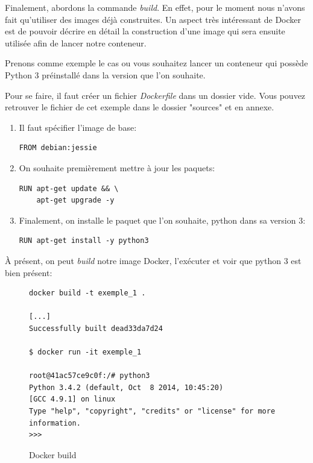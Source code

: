 Finalement, abordons la commande \emph{build}. En effet, pour le moment nous n'avons fait qu'utiliser des images déjà construites. Un aspect très intéressant de Docker est de pouvoir décrire en détail la construction d'une image qui sera ensuite utilisée afin de lancer notre conteneur.

Prenons comme exemple le cas ou vous souhaitez lancer un conteneur qui possède Python 3 préinstallé dans la version que l'on souhaite.

Pour se faire, il faut créer un fichier \emph{Dockerfile} dans un dossier vide. Vous pouvez retrouver le fichier de cet exemple dans le dossier "sources" et en annexe.

\begin{enumerate}
\item Il faut spécifier l'image de base:
\begin{lstlisting}[frame=single]
FROM debian:jessie
\end{lstlisting}

\item On souhaite premièrement mettre à jour les paquets:
\begin{lstlisting}[frame=single]
RUN apt-get update && \
    apt-get upgrade -y
\end{lstlisting}

\item Finalement, on installe le paquet que l'on souhaite, python dans sa version 3:
\begin{lstlisting}[frame=single]
RUN apt-get install -y python3
\end{lstlisting}

\end{enumerate}

\newpage
À présent, on peut \emph{build} notre image Docker, l'exécuter et voir que python 3 est bien présent:

\begin{figure}[H] 
\centering 
\begin{lstlisting}[frame=single]
docker build -t exemple_1 .

[...]
Successfully built dead33da7d24

$ docker run -it exemple_1

root@41ac57ce9c0f:/# python3
Python 3.4.2 (default, Oct  8 2014, 10:45:20) 
[GCC 4.9.1] on linux
Type "help", "copyright", "credits" or "license" for more information.
>>> 

\end{lstlisting}
\caption[Docker build]{Docker build}
\label{fig:dockerBuild} 
\end{figure}

